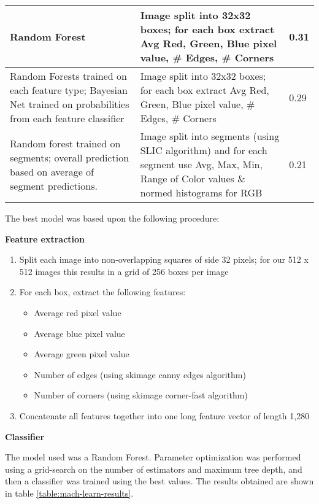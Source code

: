 \documentclass[10pt,a4paper]{article}
\begin{document}
\begin{table}[h]
\begin{tabular}{p{4cm}p{8cm}p{1.4cm}}
    \hline
    Random Forest                                                                                                                                      & Image split into 32x32 boxes; for each box extract Avg Red, Green, Blue pixel value, \# Edges, \# Corners & 0.31     \\
    \hline
	Random Forests trained on each feature type; Bayesian Net trained on probabilities from each feature classifier & Image split into 32x32 boxes; for each box extract Avg Red, Green, Blue pixel value, \# Edges, \# Corners  & 0.29     \\
	\hline
Random forest trained on segments; overall prediction based on average of segment predictions.    
     & Image split into segments (using SLIC algorithm) and for each segment use  Avg, Max, Min, Range of Color values \& normed histograms  for RGB                                           & 0.21     \\ \hline
    \end{tabular}
\label{table:classifiers}
\end{table}

The best model was based upon the following procedure:

\textbf{Feature extraction}

\begin{enumerate}
\item Split each image into non-overlapping squares of side 32 pixels; for our 512 x 512 images this results in a grid of 256 boxes per image
\item For each box, extract the following features:
\begin{itemize}
\item Average red pixel value
\item Average blue pixel value
\item Average green pixel value
\item Number of edges (using skimage canny edges algorithm)
\item Number of corners (using skimage corner-fast algorithm)
\end{itemize}
\item Concatenate all features together into one long feature vector of length 1,280
\end{enumerate}

\textbf{Classifier}

The model used was a Random Forest. Parameter optimization was performed using a grid-search on the number of estimators and maximum tree depth, and then a classifier was trained using the best values. The results obtained are shown in table \ref{table:mach-learn-results}.
\end{document}
